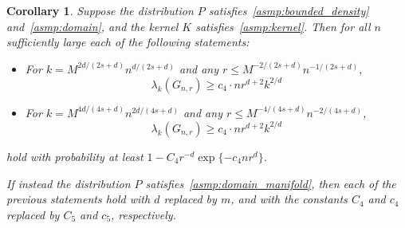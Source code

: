 \documentclass{article}
\newcommand{\1}{\mathbf{1}}
\theoremstyle{alden}
\theoremstyle{aldenthm}
\newtheorem{corollary}{Corollary}
\theoremstyle{definition}
\theoremstyle{remark}
\begin{document}
\begin{corollary}
	\label{cor:neighborhood_eigenvalue}
	Suppose the distribution $P$ satisfies~\ref{asmp:bounded_density} and~\ref{asmp:domain}, and the kernel $K$ satisfies~\ref{asmp:kernel}. Then for all $n$ sufficiently large each of the following statements:
	\begin{itemize}
		\item For $k = M^{2d/(2s + d)} n^{d/(2s + d)}$ and any $r \leq M^{-2/(2s + d)} n^{-1/(2s + d)}$, 
		\begin{equation}
		\label{eqn:neighborhood_eigenvalue_1}
		\lambda_{k}(G_{n,r}) \geq c_4 \cdot nr^{d+2}{k}^{2/d}
		\end{equation}
		\item For $k = M^{4d/(4s + d)}n^{2d/(4s + d)}$ and any $r \leq M^{-4/(4s + d)} n^{-2/(4s + d)}$,
		\begin{equation}
		\label{eqn:neighborhood_eigenvalue_2}
		\lambda_{k}(G_{n,r}) \geq c_4 \cdot nr^{d+2}{k}^{2/d}
		\end{equation}
	\end{itemize}
	hold with probability at least $1 - C_4 r^{-d} \exp\{- c_4 n r^d\}$.
	
	If instead the distribution $P$ satisfies~\ref{asmp:domain_manifold}, then each of the previous statements hold with $d$ replaced by $m$, and with the constants $C_4$ and $c_4$ replaced by $C_5$ and $c_5$, respectively.
\end{corollary}
\end{document}

